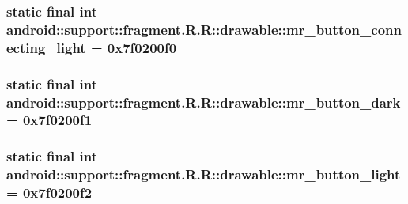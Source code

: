 \hypertarget{classandroid_1_1support_1_1fragment_1_1_r_1_1drawable_a87a9e76054352cdc2dbab39cf980bba}{
\subsubsection[{mr\_\-button\_\-connecting\_\-light}]{\setlength{\rightskip}{0pt plus 5cm}static final int android::support::fragment.R.R::drawable::mr\_\-button\_\-connecting\_\-light = 0x7f0200f0}}
\label{classandroid_1_1support_1_1fragment_1_1_r_1_1drawable_a87a9e76054352cdc2dbab39cf980bba}


\hypertarget{classandroid_1_1support_1_1fragment_1_1_r_1_1drawable_79d15aa5344ce63f305eed4cf61c05c1}{
\subsubsection[{mr\_\-button\_\-dark}]{\setlength{\rightskip}{0pt plus 5cm}static final int android::support::fragment.R.R::drawable::mr\_\-button\_\-dark = 0x7f0200f1}}
\label{classandroid_1_1support_1_1fragment_1_1_r_1_1drawable_79d15aa5344ce63f305eed4cf61c05c1}


\hypertarget{classandroid_1_1support_1_1fragment_1_1_r_1_1drawable_458ddb16e859ed4bb8ace9454bb6fdc1}{
\subsubsection[{mr\_\-button\_\-light}]{\setlength{\rightskip}{0pt plus 5cm}static final int android::support::fragment.R.R::drawable::mr\_\-button\_\-light = 0x7f0200f2}}
\label{classandroid_1_1support_1_1fragment_1_1_r_1_1drawable_458ddb16e859ed4bb8ace9454bb6fdc1}


